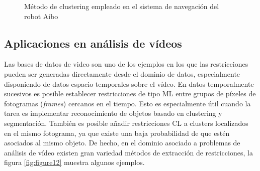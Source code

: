 \begin{figure}[bth]
	\myfloatalign
	 \quad
	 \quad
	 \quad
	\caption{Método de clustering empleado en el sistema de navegación del robot Aibo \cite{Survey:2007}}\label{fig:figure11}
\end{figure}

\subsection{Aplicaciones en análisis de vídeos}

Las bases de datos de video son uno de los ejemplos en los que las restricciones pueden ser generadas directamente desde el dominio de datos, especialmente disponiendo de datos espacio-temporales sobre el vídeo. En datos temporalmente sucesivos es posible establecer restricciones de tipo \acf{ML} entre grupos de píxeles de fotogramas (\textit{frames}) cercanos en el tiempo. Esto es especialmente útil cuando la tarea es implementar reconocimiento de objetos basado en clustering y segmentación. También es posible añadir restricciones \acf{CL} a clusters localizados en el mismo fotograma, ya que existe una baja probabilidad de que estén asociados al mismo objeto. De hecho, en el dominio asociado a problemas de análisis de vídeo existen gran variedad métodos de extracción de restricciones, la figura \ref{fig:figure12} muestra algunos ejemplos.  

